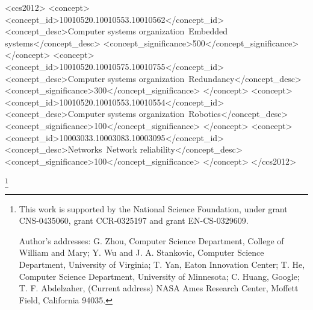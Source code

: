 \documentclass[manuscript, review, screen]{acmart}
\begin{document}
%
%
\begin{CCSXML}
<ccs2012>
 <concept>
  <concept_id>10010520.10010553.10010562</concept_id>
  <concept_desc>Computer systems organization~Embedded systems</concept_desc>
  <concept_significance>500</concept_significance>
 </concept>
 <concept>
  <concept_id>10010520.10010575.10010755</concept_id>
  <concept_desc>Computer systems organization~Redundancy</concept_desc>
  <concept_significance>300</concept_significance>
 </concept>
 <concept>
  <concept_id>10010520.10010553.10010554</concept_id>
  <concept_desc>Computer systems organization~Robotics</concept_desc>
  <concept_significance>100</concept_significance>
 </concept>
 <concept>
  <concept_id>10003033.10003083.10003095</concept_id>
  <concept_desc>Networks~Network reliability</concept_desc>
  <concept_significance>100</concept_significance>
 </concept>
</ccs2012>  
\end{CCSXML}


%
%




\thanks{This work is supported by the National Science Foundation,
  under grant CNS-0435060, grant CCR-0325197 and grant EN-CS-0329609.

  Author's addresses: G. Zhou, Computer Science Department, College of
  William and Mary; Y. Wu {and} J. A. Stankovic, Computer Science
  Department, University of Virginia; T. Yan, Eaton Innovation Center;
  T. He, Computer Science Department, University of Minnesota; C.
  Huang, Google; T. F. Abdelzaher, (Current address) NASA Ames
  Research Center, Moffett Field, California 94035.}


\maketitle



\end{document}
